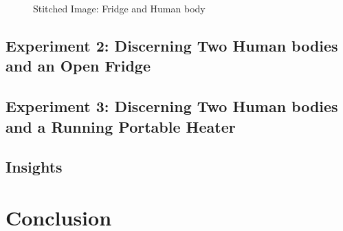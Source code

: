 \documentclass{sig-alternate}
\begin{document}
\begin{figure*}[!htp] 
\begin{minipage}{0.01\textwidth}
\begin{center}
\end{center}
\end{minipage}
\begin{minipage}{1.2\textwidth}
\begin{center}
\end{center}
\end{minipage}
\caption{Stitched Image: Fridge and Human body}
\label{fig:Stitched}
\end{figure*}
 


\subsection{Experiment 2: Discerning Two Human bodies and an Open Fridge}
\subsection{Experiment 3: Discerning Two Human bodies and a Running Portable Heater}     
 
\subsection{Insights}

\section{Conclusion}	
 
\end{document}
